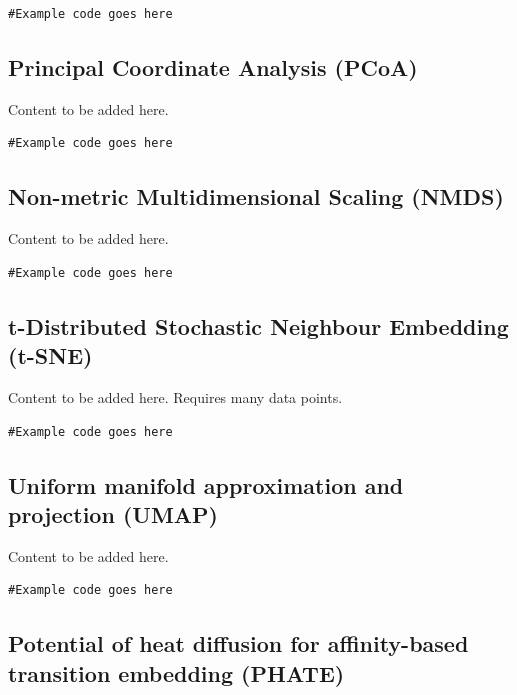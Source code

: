 \documentclass[
]{book}
\begin{document}
\begin{verbatim}
#Example code goes here
\end{verbatim}

\hypertarget{pcoa}{%
\subsection{Principal Coordinate Analysis (PCoA)}\label{pcoa}}

Content to be added here.

\begin{verbatim}
#Example code goes here
\end{verbatim}

\hypertarget{nmds}{%
\subsection{Non-metric Multidimensional Scaling (NMDS)}\label{nmds}}

Content to be added here.

\begin{verbatim}
#Example code goes here
\end{verbatim}

\hypertarget{t-sne}{%
\subsection{t-Distributed Stochastic Neighbour Embedding (t-SNE)}\label{t-sne}}

Content to be added here.
Requires many data points.

\begin{verbatim}
#Example code goes here
\end{verbatim}

\hypertarget{umap}{%
\subsection{Uniform manifold approximation and projection (UMAP)}\label{umap}}

Content to be added here.

\begin{verbatim}
#Example code goes here
\end{verbatim}

\hypertarget{phate}{%
\subsection{Potential of heat diffusion for affinity-based transition embedding (PHATE)}\label{phate}}
\end{document}
